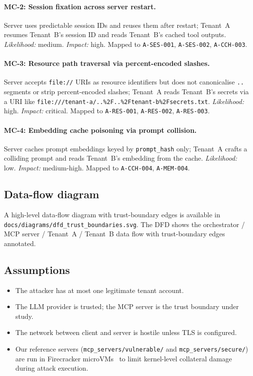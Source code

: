 \paragraph{MC-2: Session fixation across server restart.} Server
uses predictable session IDs and reuses them after restart;
Tenant~A resumes Tenant~B's session ID and reads Tenant~B's
cached tool outputs. \emph{Likelihood:} medium. \emph{Impact:}
high. Mapped to \texttt{A-SES-001}, \texttt{A-SES-002},
\texttt{A-CCH-003}.

\paragraph{MC-3: Resource path traversal via percent-encoded
slashes.} Server accepts \texttt{file://} URIs as resource
identifiers but does not canonicalise \texttt{..} segments or
strip percent-encoded slashes; Tenant~A reads
Tenant~B's secrets via a URI like
\texttt{file:///tenant-a/..\%2F..\%2Ftenant-b\%2Fsecrets.txt}.
\emph{Likelihood:} high. \emph{Impact:} critical. Mapped to
\texttt{A-RES-001}, \texttt{A-RES-002}, \texttt{A-RES-003}.

\paragraph{MC-4: Embedding cache poisoning via prompt collision.}
Server caches prompt embeddings keyed by \texttt{prompt\_hash}
only; Tenant~A crafts a colliding prompt and reads
Tenant~B's embedding from the cache. \emph{Likelihood:} low.
\emph{Impact:} medium-high. Mapped to \texttt{A-CCH-004},
\texttt{A-MEM-004}.

\subsection{Data-flow diagram}

A high-level data-flow diagram with trust-boundary edges is
available in \texttt{docs/diagrams/dfd\_trust\_boundaries.svg}.
The DFD shows the orchestrator / MCP server / Tenant~A /
Tenant~B data flow with trust-boundary edges annotated.

\subsection{Assumptions}

\begin{itemize}
  \item The attacker has at most one legitimate tenant account.
  \item The LLM provider is trusted; the MCP server is the
        trust boundary under study.
  \item The network between client and server is hostile unless
        TLS is configured.
  \item Our reference servers (\texttt{mcp\_servers/vulnerable/}
        and \texttt{mcp\_servers/secure/}) are run in Firecracker
        microVMs~\cite{firecracker_github} to limit kernel-level
        collateral damage during attack execution.
\end{itemize}

